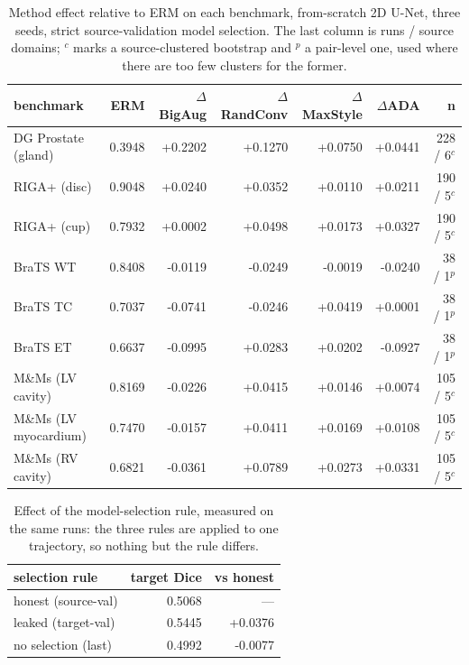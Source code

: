 \begin{table}[t]
\centering
\caption{Method effect relative to ERM on each benchmark, from-scratch 2D U-Net, three seeds, strict source-validation model selection. The last column is runs / source domains; $^{c}$ marks a source-clustered bootstrap and $^{p}$ a pair-level one, used where there are too few clusters for the former.}
\label{tab:main}
\scriptsize
\setlength{\tabcolsep}{2pt}
\renewcommand{\arraystretch}{1.05}
\begin{tabular}{lrrrrrr}
\hline
benchmark & ERM & $\Delta$BigAug & $\Delta$RandConv & $\Delta$MaxStyle & $\Delta$ADA & n \\
\hline
DG Prostate (gland) & 0.3948 & +0.2202 & +0.1270 & +0.0750 & +0.0441 & 228 / 6$^{c}$ \\
RIGA+ (disc) & 0.9048 & +0.0240 & +0.0352 & +0.0110 & +0.0211 & 190 / 5$^{c}$ \\
RIGA+ (cup) & 0.7932 & +0.0002 & +0.0498 & +0.0173 & +0.0327 & 190 / 5$^{c}$ \\
BraTS WT & 0.8408 & -0.0119 & -0.0249 & -0.0019 & -0.0240 & 38 / 1$^{p}$ \\
BraTS TC & 0.7037 & -0.0741 & -0.0246 & +0.0419 & +0.0001 & 38 / 1$^{p}$ \\
BraTS ET & 0.6637 & -0.0995 & +0.0283 & +0.0202 & -0.0927 & 38 / 1$^{p}$ \\
M\&Ms (LV cavity) & 0.8169 & -0.0226 & +0.0415 & +0.0146 & +0.0074 & 105 / 5$^{c}$ \\
M\&Ms (LV myocardium) & 0.7470 & -0.0157 & +0.0411 & +0.0169 & +0.0108 & 105 / 5$^{c}$ \\
M\&Ms (RV cavity) & 0.6821 & -0.0361 & +0.0789 & +0.0273 & +0.0331 & 105 / 5$^{c}$ \\
\hline
\end{tabular}
\end{table}

\begin{table}[t]
\centering
\caption{Effect of the model-selection rule, measured on the same runs: the three rules are applied to one trajectory, so nothing but the rule differs.}
\label{tab:leak}
\scriptsize
\setlength{\tabcolsep}{2pt}
\renewcommand{\arraystretch}{1.05}
\begin{tabular}{lrr}
\hline
selection rule & target Dice & vs honest \\
\hline
honest (source-val) & 0.5068 & — \\
leaked (target-val) & 0.5445 & +0.0376 \\
no selection (last) & 0.4992 & -0.0077 \\
\hline
\end{tabular}
\end{table}

